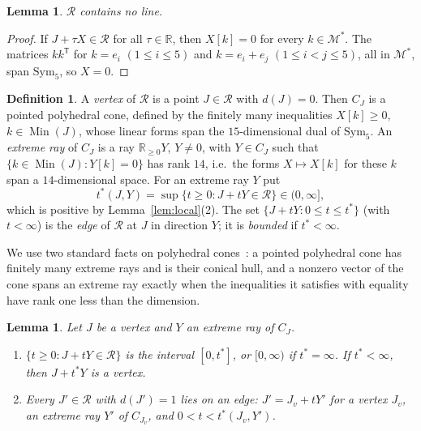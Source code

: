\documentclass[11pt]{amsart}
\newtheorem{lemma}[theorem]{Lemma}
\theoremstyle{definition}
\newtheorem{definition}[theorem]{Definition}
\theoremstyle{remark}
\numberwithin{equation}{section}
\numberwithin{table}{section}
\numberwithin{figure}{section}
\newcommand{\R}{\mathbb{R}}
\newcommand{\M}{\mathcal{M}}
\newcommand{\Rk}{\mathcal{R}}
\newcommand{\Sym}{\mathrm{Sym}}
\newcommand{\Min}{\operatorname{Min}}
\begin{document}
\begin{lemma}\label{lem:nolines}
$\Rk$ contains no line.
\end{lemma}

\begin{proof}
If $J+\tau X\in\Rk$ for all $\tau\in\R$, then $X[k]=0$ for every $k\in\M^*$. The matrices $kk^{\mathsf T}$ for $k=e_i$ $(1\le i\le5)$ and $k=e_i+e_j$ $(1\le i<j\le5)$, all in $\M^*$, span $\Sym_5$, so $X=0$.
\end{proof}

\begin{definition}
A \emph{vertex} of $\Rk$ is a point $J\in\Rk$ with $d(J)=0$. Then $C_J$ is a pointed polyhedral cone, defined by the finitely many inequalities $X[k]\ge0$, $k\in\Min(J)$, whose linear forms span the $15$-dimensional dual of $\Sym_5$. An \emph{extreme ray} of $C_J$ is a ray $\R_{\ge0}Y$, $Y\ne0$, with $Y\in C_J$ such that $\{k\in\Min(J):Y[k]=0\}$ has rank $14$, i.e.\ the forms $X\mapsto X[k]$ for these $k$ span a $14$-dimensional space. For an extreme ray $Y$ put
\[
t^*(J,Y)=\sup\{t\ge0:J+tY\in\Rk\}\in(0,\infty],
\]
which is positive by Lemma~\ref{lem:local}(2). The set $\{J+tY:0\le t\le t^*\}$ (with $t<\infty$) is the \emph{edge} of $\Rk$ at $J$ in direction $Y$; it is \emph{bounded} if $t^*<\infty$.
\end{definition}

We use two standard facts on polyhedral cones~\cite[Lecture~1]{Ziegler1995}: a pointed polyhedral cone has finitely many extreme rays and is their conical hull, and a nonzero vector of the cone spans an extreme ray exactly when the inequalities it satisfies with equality have rank one less than the dimension.

\begin{lemma}\label{lem:edges}
Let $J$ be a vertex and $Y$ an extreme ray of $C_J$.
\begin{enumerate}
\item $\{t\ge0:J+tY\in\Rk\}$ is the interval $[0,t^*]$, or $[0,\infty)$ if $t^*=\infty$. If $t^*<\infty$, then $J+t^*Y$ is a vertex.
\item Every $J'\in\Rk$ with $d(J')=1$ lies on an edge: $J'=J_v+tY'$ for a vertex $J_v$, an extreme ray $Y'$ of $C_{J_v}$, and $0<t<t^*(J_v,Y')$.
\end{enumerate}
\end{lemma}
\end{document}
